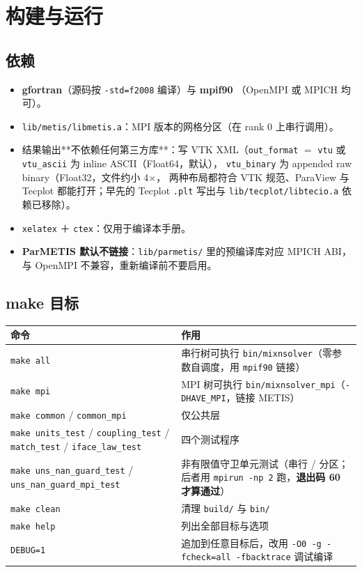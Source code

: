 \documentclass[11pt,a4paper]{ctexart}
\begin{document}
\section{构建与运行}\label{sec:build}

\subsection{依赖}

\begin{itemize}\itemsep2pt
  \item \textbf{gfortran}（源码按 \texttt{-std=f2008} 编译）与 \textbf{mpif90}
        （OpenMPI 或 MPICH 均可）。
  \item \texttt{lib/metis/libmetis.a}：MPI 版本的网格分区（在 rank 0 上串行调用）。
  \item 结果输出**不依赖任何第三方库**：写 VTK XML（\texttt{out\_format} $=$
        \texttt{vtu} 或 \texttt{vtu\_ascii} 为 inline ASCII（Float64，默认），
        \texttt{vtu\_binary} 为 appended raw binary（Float32，文件约小 4$\times$，
        两种布局都符合 VTK 规范、ParaView 与 Tecplot 都能打开；早先的 Tecplot
        \texttt{.plt} 写出与 \texttt{lib/tecplot/libtecio.a} 依赖已移除）。
  \item \texttt{xelatex} ＋ \texttt{ctex}：仅用于编译本手册。
  \item \textbf{ParMETIS 默认不链接}：\texttt{lib/parmetis/} 里的预编译库对应
        MPICH ABI，与 OpenMPI 不兼容，重新编译前不要启用。
\end{itemize}

\subsection{make 目标}

\begin{center}\small
\begin{tabular}{@{}>{\raggedright\arraybackslash}p{}>{\raggedright\arraybackslash}p{}@{}}
\toprule
命令 & 作用 \\
\midrule
\texttt{make all} & 串行树可执行 \texttt{bin/mixnsolver}（零参数自调度，用 \texttt{mpif90} 链接） \\
\texttt{make mpi} & MPI 树可执行 \texttt{bin/mixnsolver\_mpi}（\texttt{-DHAVE\_MPI}，链接 METIS） \\
\texttt{make common} / \texttt{common\_mpi} & 仅公共层 \\
\texttt{make units\_test} / \texttt{coupling\_test} / \texttt{match\_test} / \texttt{iface\_law\_test} & 四个测试程序 \\
\texttt{make uns\_nan\_guard\_test} / \texttt{uns\_nan\_guard\_mpi\_test} & 非有限值守卫单元测试（串行 / 分区；后者用 \texttt{mpirun -np 2} 跑，\textbf{退出码 60 才算通过}） \\
\texttt{make clean} & 清理 \texttt{build/} 与 \texttt{bin/} \\
\texttt{make help} & 列出全部目标与选项 \\
\texttt{DEBUG=1} & 追加到任意目标后，改用 \texttt{-O0 -g -fcheck=all -fbacktrace} 调试编译 \\
\bottomrule
\end{tabular}
\end{center}
\end{document}
